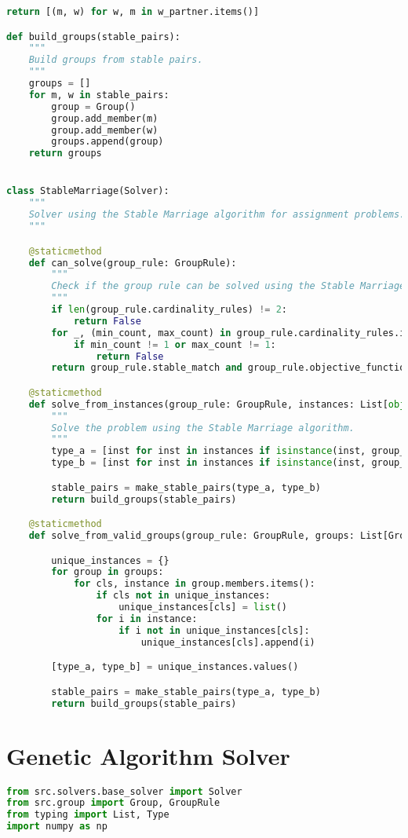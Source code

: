 \begin{apendicesenv}
\begin{lstlisting}[language=Python, caption={Stable Marriage Solver Source Code}]
    return [(m, w) for w, m in w_partner.items()]

def build_groups(stable_pairs):
    """
    Build groups from stable pairs.
    """
    groups = []
    for m, w in stable_pairs:
        group = Group()
        group.add_member(m)
        group.add_member(w)
        groups.append(group)
    return groups


class StableMarriage(Solver):
    """
    Solver using the Stable Marriage algorithm for assignment problems.
    """

    @staticmethod
    def can_solve(group_rule: GroupRule):
        """
        Check if the group rule can be solved using the Stable Marriage algorithm.
        """
        if len(group_rule.cardinality_rules) != 2:
            return False
        for _, (min_count, max_count) in group_rule.cardinality_rules.items():
            if min_count != 1 or max_count != 1:
                return False
        return group_rule.stable_match and group_rule.objective_function_name == "no_statistic"

    @staticmethod
    def solve_from_instances(group_rule: GroupRule, instances: List[object]):
        """
        Solve the problem using the Stable Marriage algorithm.
        """
        type_a = [inst for inst in instances if isinstance(inst, group_rule.types[0])]
        type_b = [inst for inst in instances if isinstance(inst, group_rule.types[1])]

        stable_pairs = make_stable_pairs(type_a, type_b)
        return build_groups(stable_pairs)

    @staticmethod
    def solve_from_valid_groups(group_rule: GroupRule, groups: List[Group]):

        unique_instances = {}
        for group in groups:
            for cls, instance in group.members.items():
                if cls not in unique_instances:
                    unique_instances[cls] = list()
                for i in instance:
                    if i not in unique_instances[cls]:
                        unique_instances[cls].append(i)

        [type_a, type_b] = unique_instances.values()

        stable_pairs = make_stable_pairs(type_a, type_b)
        return build_groups(stable_pairs)
\end{lstlisting}

\chapter{Genetic Algorithm Solver}
\label{app:solver_ga}
\begin{lstlisting}[language=Python, caption={Genetic Algorithm Solver Source Code}]
from src.solvers.base_solver import Solver
from src.group import Group, GroupRule
from typing import List, Type
import numpy as np



\end{lstlisting}
\end{apendicesenv}
